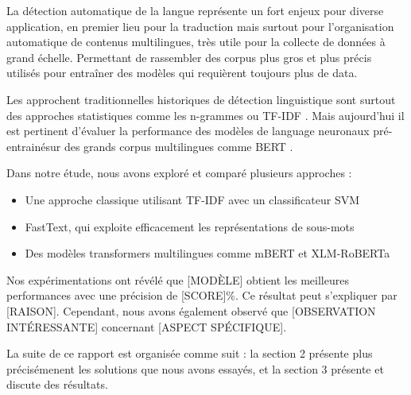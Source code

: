 
La détection automatique de la langue représente un fort enjeux pour diverse application, en premier lieu pour la traduction mais surtout pour l'organisation automatique de contenus multilingues, très utile pour la collecte de données à grand échelle. Permettant de rassembler des corpus plus gros et plus précis utilisés pour entraîner des modèles qui requièrent toujours plus de data.

Les approchent traditionnelles historiques de détection linguistique sont surtout des approches statistiques comme les n-grammes \cite{cavnar1994n} ou TF-IDF \cite{baldwin2010language}. Mais aujourd'hui il est pertinent d'évaluer la performance des modèles de language neuronaux pré-entrainésur des grands corpus multilingues comme BERT \cite{devlin2019bert}.

Dans notre étude, nous avons exploré et comparé plusieurs approches :
\begin{itemize}
    \item Une approche classique utilisant TF-IDF avec un classificateur SVM
    \item FastText, qui exploite efficacement les représentations de sous-mots \cite{joulin2017bag}
    \item Des modèles transformers multilingues comme mBERT \cite{devlin2019bert} et XLM-RoBERTa \cite{conneau2020unsupervised}
\end{itemize}

Nos expérimentations ont révélé que [MODÈLE] obtient les meilleures performances avec une précision de [SCORE]\%. Ce résultat peut s'expliquer par [RAISON]. Cependant, nous avons également observé que [OBSERVATION INTÉRESSANTE] concernant [ASPECT SPÉCIFIQUE].

La suite de ce rapport est organisée comme suit : la section 2 présente plus précisémenent les solutions que nous avons essayés, et la section 3 présente et discute des résultats.

